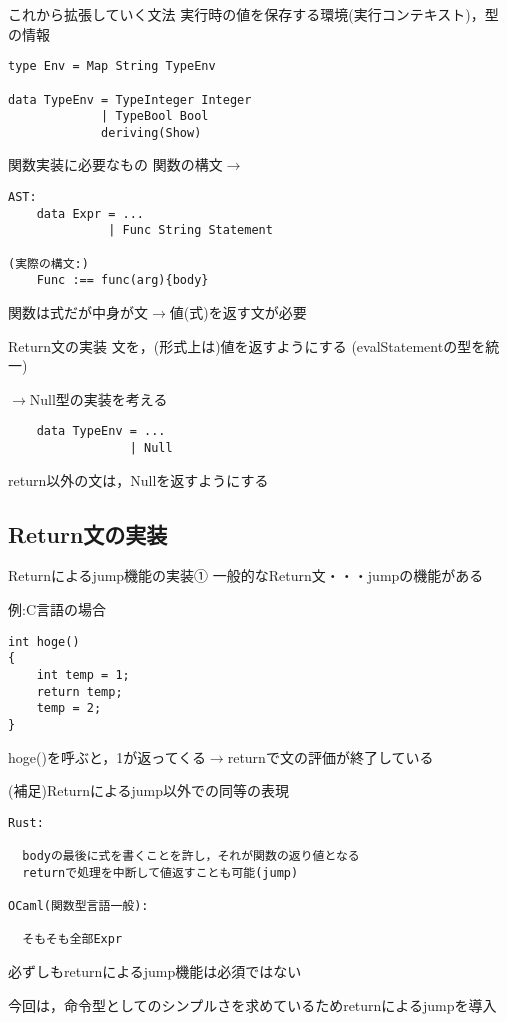 \documentclass[uplatex,dvipdfmx,ja=standard]{beamer}
\begin{document}
\begin{frame}[fragile]{これから拡張していく文法}
実行時の値を保存する環境(実行コンテキスト)，型の情報
    \begin{verbatim}
type Env = Map String TypeEnv  

data TypeEnv = TypeInteger Integer 
             | TypeBool Bool
             deriving(Show)

    \end{verbatim}
\end{frame}

\begin{frame}[fragile]{関数実装に必要なもの}
    関数の構文$\to$
    \begin{verbatim}
AST:
    data Expr = ...
              | Func String Statement

(実際の構文:)
    Func :== func(arg){body}
    \end{verbatim}
関数は式だが中身が文$\to$値(式)を返す文が必要
\end{frame}

\begin{frame}[fragile]{Return文の実装}
    文を，(形式上は)値を返すようにする (evalStatementの型を統一)

    $\to$Null型の実装を考える
    \begin{verbatim}
    data TypeEnv = ... 
                 | Null
    \end{verbatim}
    return以外の文は，Nullを返すようにする

\end{frame}

\subsection{Return文の実装}

\begin{frame}[fragile]{Returnによるjump機能の実装①}
一般的なReturn文・・・jumpの機能がある

例:C言語の場合
    \begin{verbatim}
int hoge()
{
    int temp = 1;
    return temp;
    temp = 2;
}
    \end{verbatim}
hoge()を呼ぶと，1が返ってくる$\to$returnで文の評価が終了している
\end{frame}

\begin{frame}[fragile]{(補足)Returnによるjump以外での同等の表現}
    \begin{verbatim}
Rust:

  bodyの最後に式を書くことを許し，それが関数の返り値となる
  returnで処理を中断して値返すことも可能(jump)

OCaml(関数型言語一般):

  そもそも全部Expr

    \end{verbatim}
必ずしもreturnによるjump機能は必須ではない

今回は，命令型としてのシンプルさを求めているためreturnによるjumpを導入
\end{frame}
\end{document}

